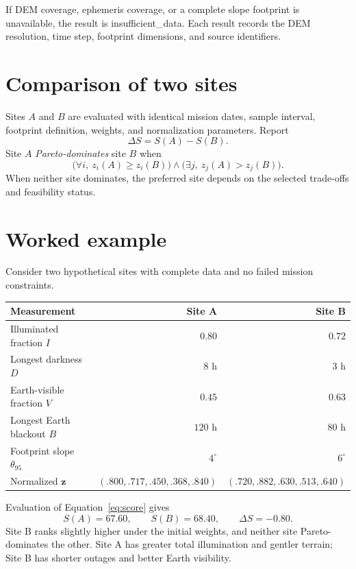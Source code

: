 \documentclass[10pt,a4paper]{article}
\newcommand{\code}[1]{{\ttfamily\small #1}}
\begin{document}
If DEM coverage, ephemeris coverage, or a complete slope footprint is unavailable, the result is \code{insufficient\_data}. Each result records the DEM resolution, time step, footprint dimensions, and source identifiers.

\section{Comparison of two sites}
Sites $A$ and $B$ are evaluated with identical mission dates, sample interval, footprint definition, weights, and normalization parameters. Report
\begin{equation}
\Delta S=S(A)-S(B).
\end{equation}
Site $A$ \emph{Pareto-dominates} site $B$ when
\begin{equation}
\bigl(\forall i,\ z_i(A)\geq z_i(B)\bigr)
\land
\bigl(\exists j,\ z_j(A)>z_j(B)\bigr).
\end{equation}
When neither site dominates, the preferred site depends on the selected trade-offs and feasibility status.

\section{Worked example}
Consider two hypothetical sites with complete data and no failed mission constraints.

\begin{center}
\small
\begin{tabular}{@{}lrr@{}}
\toprule
\textbf{Measurement} & \textbf{Site A} & \textbf{Site B}\\
\midrule
Illuminated fraction $I$ & $0.80$ & $0.72$\\
Longest darkness $D$ & $8$ h & $3$ h\\
Earth-visible fraction $V$ & $0.45$ & $0.63$\\
Longest Earth blackout $B$ & $120$ h & $80$ h\\
Footprint slope $\theta_{95}$ & $4^\circ$ & $6^\circ$\\
\midrule
Normalized $\boldsymbol{z}$ & $(.800,.717,.450,.368,.840)$ & $(.720,.882,.630,.513,.640)$\\
\bottomrule
\end{tabular}
\end{center}
Evaluation of Equation~\eqref{eq:score} gives
\begin{equation}
S(A)=67.60,\qquad S(B)=68.40,\qquad \Delta S=-0.80.
\end{equation}
Site B ranks slightly higher under the initial weights, and neither site Pareto-dominates the other. Site A has greater total illumination and gentler terrain; Site B has shorter outages and better Earth visibility.
\end{document}
